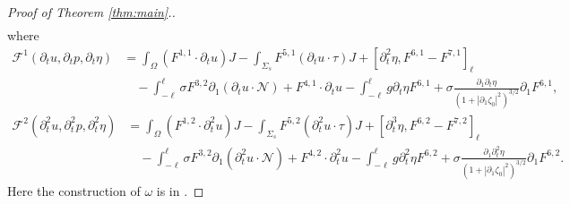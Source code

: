 \documentclass[letterpaper,reqno,10pt,twoside]{amsart}
\theoremstyle{definition}
\theoremstyle{remark}
\def\p{\partial}
\def\Om{\Omega}
\def\om{\omega}
\begin{document}
\begin{proof}[Proof of Theorem \ref{thm:main}.]
\begin{equation}
\begin{aligned}
				\end{aligned}
			\end{equation}
			where
			\[
			\begin{aligned}
				\mathcal{F}^{1}(\p_tu, \p_tp, \p_t\eta)
				&=\int_\Om (F^{1,1}\cdot\p_tu) J-\int_{\Sigma_s}F^{5,1}(\p_tu\cdot\tau)J+[\p_t^2\eta, F^{6,1}-F^{7,1}]_\ell\\
				&\quad-\int_{-\ell}^\ell\sigma F^{3,2}\p_1(\p_tu\cdot\mathcal{N})+F^{4,1}\cdot\p_tu-\int_{-\ell}^\ell g\p_t\eta F^{6,1}+\sigma\frac{\p_1\p_t\eta}{(1+|\p_1\zeta_0|^2)^{3/2}}\p_1F^{6,1},
			\end{aligned}
			\]
			\[
			\begin{aligned}
				\mathcal{F}^{2}(\p_{t}^{2}u,\p_{t}^{2}p,\p_{t}^{2}\eta)&=\int_\Om (F^{1,2}\cdot\p_t^{2}u) J-\int_{\Sigma_s}F^{5,2}(\p_t^{2}u\cdot\tau)J+[\p_t^3\eta, F^{6,2}-F^{7,2}]_\ell\\
				&\quad-\int_{-\ell}^\ell\sigma F^{3,2}\p_1(\p_{t}^{2}u\cdot\mathcal{N})+F^{4,2}\cdot\p_t^{2}u-\int_{-\ell}^\ell g\p_t^{2}\eta F^{6,2}+\sigma\frac{\p_1\p_t^{2}\eta}{(1+|\p_1\zeta_0|^2)^{3/2}}\p_1F^{6,2}.
			\end{aligned}
			\]
			Here the construction of $\om$ is in \cite[Proposition 10.1]{GT2020}.
			

\end{proof}
\end{document}

